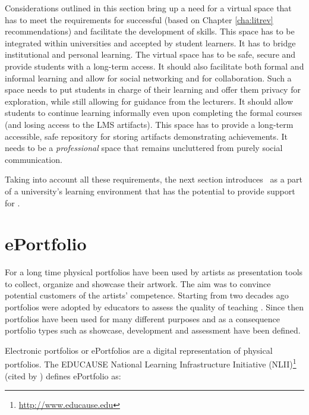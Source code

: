 Considerations outlined in this section bring up a need for a virtual space that
has to meet the requirements for successful \LLLs (based on Chapter
\ref{cha:litrev} recommendations) and facilitate the development of \LLLs
skills. This space has to be integrated within universities and accepted by
student learners. It has to bridge institutional and personal learning. The
virtual space has to be safe, secure and provide students with a long-term
access. It should also facilitate both formal and informal learning and allow
for social networking and for collaboration. Such a space needs to put students
in charge of their learning and offer them privacy for exploration, while still
allowing for guidance from the lecturers. It should allow students to continue
learning informally even upon completing the formal courses (and losing access
to the LMS artifacts). This space has to provide a long-term accessible, safe
repository for storing artifacts demonstrating achievements. It needs to be a
\textit{professional} space that remains uncluttered from purely social
communication.

Taking into account all these requirements, the next section introduces \ep~as a
part of a university's learning environment that has the potential to provide
support for \LLLsn.

\section{ePortfolio}
For a long time physical portfolios have been used by artists as presentation
tools to collect, organize and showcase their artwork. The aim was to convince
potential customers of the artists' competence. Starting from two decades ago
portfolios were adopted by educators to assess the quality of teaching
\citep{VanTartwijkJ.2004}. Since then portfolios have been used for many
different purposes and as a consequence portfolio types such as showcase,
development and assessment have been defined.
 
Electronic portfolios or ePortfolios are a digital representation of physical
portfolios. The EDUCAUSE National Learning Infrastructure Initiative
(NLII)\footnote{\url{http://www.educause.edu}} (cited by
\citealp{IMSGlobalLearningConsortium2005}) defines ePortfolio as:


